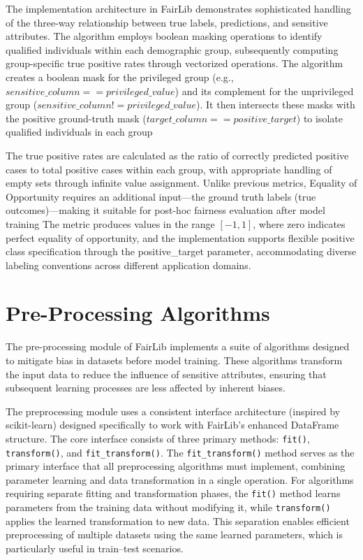 \documentclass[12pt,a4paper,openright,twoside]{book}
\begin{document}
The implementation architecture in FairLib demonstrates sophisticated handling of the three-way relationship between true labels, predictions, and sensitive attributes. The algorithm employs boolean masking operations to identify qualified individuals within each demographic group, subsequently computing group-specific true positive rates through vectorized operations. The algorithm creates a boolean mask for the privileged group (e.g., $sensitive\_column == privileged\_value$) and its complement for the unprivileged group ($sensitive\_column != privileged\_value$). It then intersects these masks with the positive ground-truth mask ($target\_column == positive\_target$) to isolate qualified individuals in each group

The true positive rates are calculated as the ratio of correctly predicted positive cases to total positive cases within each group, with appropriate handling of empty sets through infinite value assignment. Unlike previous metrics, Equality of Opportunity requires an additional input—the ground truth labels (true outcomes)—making it suitable for post-hoc fairness evaluation after model training The metric produces values in the range $[-1, 1]$, where zero indicates perfect equality of opportunity, and the implementation supports flexible positive class specification through the positive\_target parameter, accommodating diverse labeling conventions across different application domains.

\section{Pre-Processing Algorithms}
The pre-processing module of FairLib implements a suite of algorithms designed to mitigate bias in datasets before model training. These algorithms transform the input data to reduce the influence of sensitive attributes, ensuring that subsequent learning processes are less affected by inherent biases.

The preprocessing module uses a consistent interface architecture (inspired by scikit-learn) designed specifically to work with FairLib’s enhanced DataFrame structure. The core interface consists of three primary methods: \texttt{fit()}, \texttt{transform()}, and \texttt{fit\_transform()}. The \texttt{fit\_transform()} method serves as the primary interface that all preprocessing algorithms must implement, combining parameter learning and data transformation in a single operation. For algorithms requiring separate fitting and transformation phases, the \texttt{fit()} method learns parameters from the training data without modifying it, while \texttt{transform()} applies the learned transformation to new data. This separation enables efficient preprocessing of multiple datasets using the same learned parameters, which is particularly useful in train–test scenarios.
\end{document}
